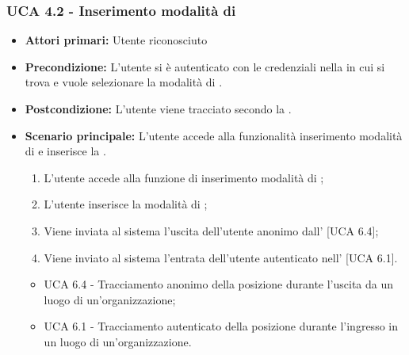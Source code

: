 \subsubsection{UCA 4.2 - Inserimento modalità di }%
\begin{itemize}
	\item \textbf{Attori primari:} Utente riconosciuto
	\item \textbf{Precondizione:} L'utente si è autenticato con le credenziali  nella  in cui si trova e vuole selezionare la modalità di .
	\item \textbf{Postcondizione:} L'utente viene tracciato secondo la .
	\item \textbf{Scenario principale:} L'utente accede alla funzionalità inserimento modalità di  e inserisce la .
	\begin{enumerate}
		\item L'utente accede alla funzione di inserimento modalità di ;
		\item L'utente inserisce la modalità di ;
		\item Viene inviata al sistema l'uscita dell'utente anonimo dall' [UCA 6.4];
		\item Viene inviato al sistema l'entrata dell'utente autenticato nell' [UCA 6.1].
	\end{enumerate}
	\begin{itemize}
		\item UCA 6.4 - Tracciamento anonimo della posizione durante l'uscita da un luogo di un'organizzazione;
		\item UCA 6.1 - Tracciamento autenticato della posizione durante l'ingresso in un luogo di un'organizzazione.
	\end{itemize}
\end{itemize}
